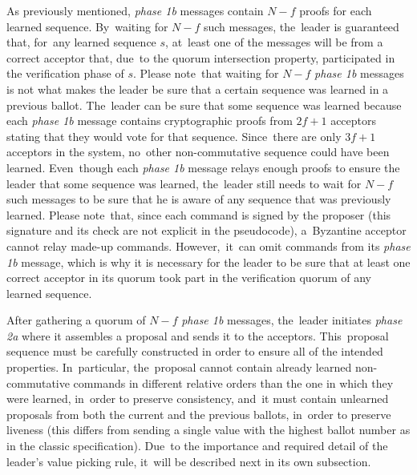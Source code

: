 \documentclass[algorithms,article,accept,moreauthors,pdftex,10pt,a4paper]{Definitions/mdpi}
\begin{document}
As previously mentioned, \textit{phase 1b} messages contain $N-f$ proofs for each learned sequence. By~waiting for $N-f$ such messages, the~leader is guaranteed that, for~any learned sequence $s$, at~least one of the messages will be from a correct acceptor that, due~to the quorum intersection property, participated in the verification phase of $s$. Please note~that waiting for $N-f$ \textit{phase 1b} messages is not what makes the leader be sure that a certain sequence was learned in a previous ballot. The~leader can be sure that some sequence was learned because each \textit{phase 1b} message contains cryptographic proofs from $2f+1$ acceptors stating that they would vote for that sequence. Since~there are only $3f+1$ acceptors in the system, no~other non-commutative sequence could have been learned. Even~though each \textit{phase 1b} message relays enough proofs to ensure the leader that some sequence was learned, the~leader still needs to wait for $N-f$ such messages to be sure that he is aware of any sequence that was previously learned. Please note~that, since each command is signed by the proposer (this signature and its check are not explicit in the pseudocode), a~Byzantine acceptor cannot relay made-up commands. However,~it~can omit commands from its \textit{phase 1b} message, which is why it is necessary for the leader to be sure that at least one correct acceptor in its quorum took part in the verification quorum of any learned sequence. \par
After gathering a quorum of $N-f$ \textit{phase 1b} messages, the~leader initiates \textit{phase 2a} where it assembles a proposal and sends it to the acceptors. This~proposal sequence must be carefully constructed in order to ensure all of the intended properties. In~particular, the~proposal cannot contain already learned non-commutative commands in different relative orders than the one in which they were learned, in~order to preserve consistency, and~it must contain unlearned proposals from both the current and the previous ballots, in~order to preserve liveness (this differs from sending a single value with the highest ballot number as in the classic specification). Due~to the importance and required detail of the leader's value picking rule, it~will be described next in its own subsection. \par
\end{document}
